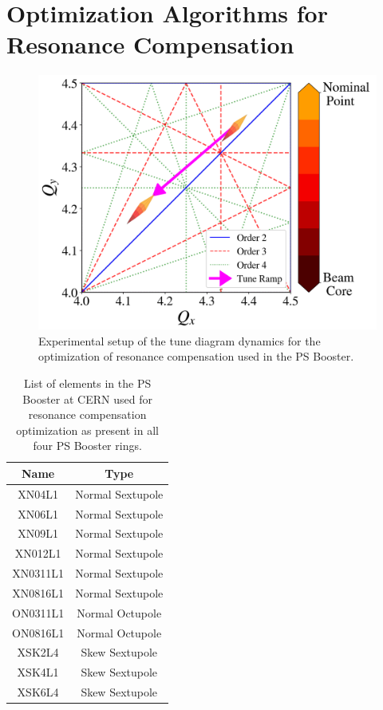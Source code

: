 \section{Optimization Algorithms for Resonance Compensation}

\cite{geoff} \cite{albright}


\begin{figure}[H]
    \centering
    \includegraphics[width=\linewidth]{chapter5/experiment.png}
    \caption{Experimental setup of the tune diagram dynamics for the optimization of resonance compensation used in the PS Booster.}
    \label{fig:experimentPSB}
\end{figure}

\begin{table}[H]
    \centering
    \caption{List of elements in the PS Booster at CERN used for resonance compensation optimization as present in all four PS Booster rings.}
    \label{tab:psbcomp}
    \begin{tabular}{|c|c|}
    \hline
    \textbf{Name} & \textbf{Type}    \\ \hline
    XN04L1    & Normal Sextupole \\ \hline
    XN06L1    & Normal Sextupole \\ \hline
    XN09L1    & Normal Sextupole \\ \hline
    XN012L1    & Normal Sextupole \\ \hline
    XN0311L1    & Normal Sextupole   \\ \hline
    XN0816L1    & Normal Sextupole   \\ \hline
    ON0311L1    & Normal Octupole  \\ \hline
    ON0816L1    & Normal Octupole   \\ \hline
    XSK2L4    & Skew Sextupole  \\ \hline
    XSK4L1    & Skew Sextupole   \\ \hline
    XSK6L4    & Skew Sextupole   \\ \hline
    \end{tabular}
\end{table}

